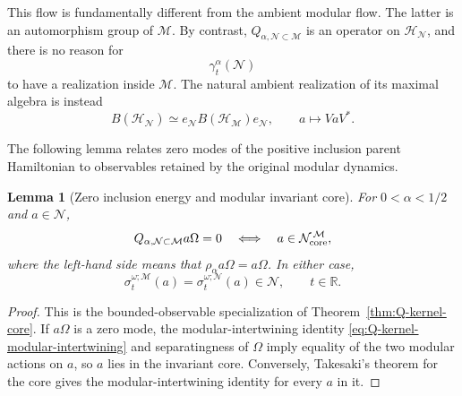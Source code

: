 \documentclass[a4paper,11pt]{article}
\newtheorem{lemma}[theorem]{Lemma}
\theoremstyle{definition}
\newcommand{\mN}{\mathcal{N}}
\newcommand{\mH}{\mathcal{H}}
\newcommand{\mM}{\mathcal{M}}
\begin{document}
This flow is fundamentally different from the ambient modular flow.
The latter is an automorphism group of $\mM$. By contrast,
$Q_{\alpha,\mN\subset\mM}$ is an operator on $\mH_{\mN}$, and there is
no reason for
\begin{equation}
    \gamma_t^\alpha(\mN)
\end{equation}
to have a realization inside $\mM$. The natural ambient realization
of its maximal algebra is instead
\begin{equation}
    B(\mH_{\mN})
    \simeq
    e_{\mN}B(\mH_{\mM})e_{\mN},
    \qquad
    a\longmapsto VaV^* .
    \label{eq:BHN-corner}
\end{equation}

The following lemma relates zero modes of the positive inclusion parent Hamiltonian
to observables retained by the original modular dynamics.

\begin{lemma}[Zero inclusion energy and modular invariant core]
\label{lem:zero-energy-modular-memory}
For $0<\alpha<1/2$ and $a\in\mN$,
\begin{equation}
 Q_{\alpha,\mN\subset\mM}a\Omega=0
 \quad\Longleftrightarrow\quad
 a\in\mN_{\rm core}^{\,\mM},
 \label{eq:Halpha-zero-a}
\end{equation}
where the left-hand side means that $\rho_\alpha a\Omega=a\Omega$.
In either case,
\begin{equation}
 \sigma_t^{\omega;\mM}(a)
 =\sigma_t^{\omega;\mN}(a)\in\mN,
 \qquad t\in\mathbb R.
 \label{eq:zero-energy-intertwining}
\end{equation}
\end{lemma}
\begin{proof}
This is the bounded-observable specialization of
Theorem~\ref{thm:Q-kernel-core}. If $a\Omega$ is a zero mode, the
modular-intertwining identity \eqref{eq:Q-kernel-modular-intertwining}
and separatingness of $\Omega$ imply equality of the two modular
actions on $a$, so $a$ lies in the invariant core. Conversely,
Takesaki's theorem for the core gives the modular-intertwining
identity for every $a$ in it.
\end{proof}
\end{document}
